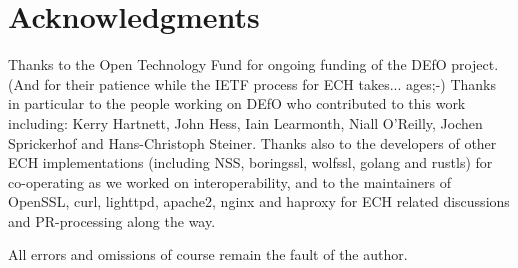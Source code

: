 \section*{Acknowledgments}

Thanks to the Open Technology Fund for ongoing funding of the DEfO
project. (And for their patience while the IETF process for ECH takes...
ages;-)
Thanks in particular to the people working on DEfO who contributed to this work
including:
Kerry Hartnett,
John Hess,
Iain Learmonth,
Niall O'Reilly,
Jochen Sprickerhof
and Hans-Christoph Steiner.
Thanks also to the developers of other ECH implementations (including
NSS, boringssl, wolfssl, golang and rustls) for co-operating as we worked on
interoperability, and to the maintainers of OpenSSL, curl, lighttpd, apache2,
nginx and haproxy for ECH related discussions and PR-processing along the way.

All errors and omissions of course remain the fault of the author.
